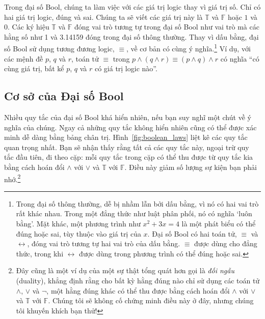 Trong đại số Bool, chúng ta làm việc với các giá trị logic thay vì giá trị số. Chỉ có hai giá trị logic, đúng và sai. Chúng ta sẽ viết các giá trị này là $\mathbb{T}$ và $\mathbb{F}$ hoặc $1$ và $0$. Các ký hiệu $\mathbb{T}$ và $\mathbb{F}$ đóng vai trò tương tự trong đại số Bool như vai trò mà các hằng số như 1 và 3.14159 đóng trong đại số thông thường. Thay vì dấu bằng, đại số Bool sử dụng tương đương logic, $\equiv$, về cơ bản có cùng ý nghĩa.\footnote{Trong đại số thông thường, dễ bị nhầm lẫn bởi dấu bằng, vì nó có hai vai trò rất khác nhau. Trong một đẳng thức như luật phân phối, nó có nghĩa `luôn bằng'. Mặt khác, một phương trình như $x^2 + 3x = 4$ là một phát biểu có thể đúng hoặc sai, tùy thuộc vào giá trị của $x$. Đại số Bool có hai toán tử, $\equiv$ và $\leftrightarrow$, đóng vai trò tương tự hai vai trò của dấu bằng. $\equiv$ được dùng cho đẳng thức, trong khi $\leftrightarrow$ được dùng trong phương trình có thể đúng hoặc sai.} Ví dụ, với các mệnh đề $p$, $q$ và $r$, toán tử $\equiv$ trong $p \land (q \land r) \equiv (p \land q) \land r$ có nghĩa ``có cùng giá trị, bất kể $p$, $q$ và $r$ có giá trị logic nào''.

\subsection{Cơ sở của Đại số Bool}

Nhiều quy tắc của đại số Bool khá hiển nhiên, nếu bạn suy nghĩ một chút về ý nghĩa của chúng. Ngay cả những quy tắc không hiển nhiên cũng có thể được xác minh dễ dàng bằng bảng chân trị. Hình~\ref{fig:boolean_laws} liệt kê các quy tắc quan trọng nhất. Bạn sẽ nhận thấy rằng tất cả các quy tắc này, ngoại trừ quy tắc đầu tiên, đi theo cặp: mỗi quy tắc trong cặp có thể thu được từ quy tắc kia bằng cách hoán đổi $\land$ với $\lor$ và $\mathbb{T}$ với $\mathbb{F}$. Điều này giảm số lượng sự kiện bạn phải nhớ.\footnote{Đây cũng là một ví dụ của một sự thật tổng quát hơn gọi là \emph{đối ngẫu} (duality), khẳng định rằng cho bất kỳ hằng đúng nào chỉ sử dụng các toán tử $\land$, $\lor$ và $\lnot$, một hằng đúng khác có thể thu được bằng cách hoán đổi $\land$ với $\lor$ và $\mathbb{T}$ với $\mathbb{F}$. Chúng tôi sẽ không cố chứng minh điều này ở đây, nhưng chúng tôi khuyến khích bạn thử!}

